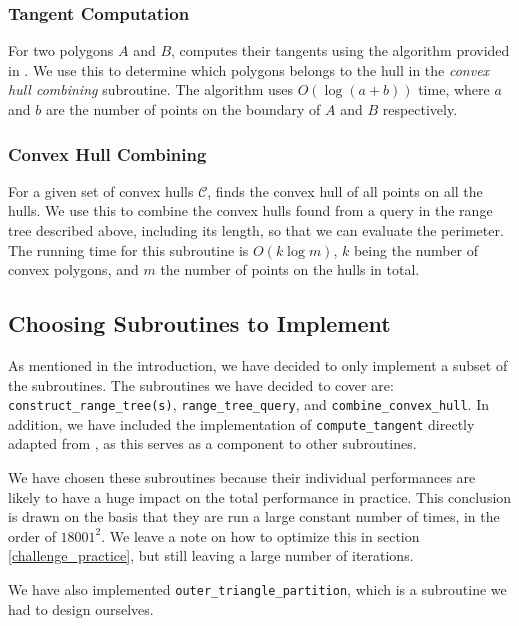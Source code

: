 \documentclass{article}
\begin{document}
\subsubsection{Tangent Computation} \label{subsub:tangent_computation}

For two polygons $A$ and $B$, computes their tangents using the algorithm provided in \cite{ks95}. We use this to determine which polygons belongs to the hull in the \textit{convex hull combining} subroutine. The algorithm uses $O(\log(a + b))$ time, where $a$ and $b$ are the number of points on the boundary of $A$ and $B$ respectively.

\subsubsection{Convex Hull Combining}
For a given set of convex hulls $\mathcal{C}$, finds the convex hull of all points on all the hulls. We use this to combine the convex hulls found from a query in the range tree described above, including its length, so that we can evaluate the perimeter. The running time for this subroutine is $O(k \log m)$, $k$ being the number of convex polygons, and $m$ the number of points on the hulls in total.

\subsection{Choosing Subroutines to Implement}

As mentioned in the introduction, we have decided to only implement a subset of the subroutines. The subroutines we have decided to cover are: \texttt{construct\_range\_tree(s)}, \texttt{range\_tree\_query}, and \texttt{combine\_convex\_hull}. In addition, we have included the implementation of \texttt{compute\_tangent} directly adapted from \cite{ks95}, as this serves as a component to other subroutines. 

We have chosen these subroutines because their individual performances are likely to have a huge impact on the total performance in practice. This conclusion is drawn on the basis that they are run a large constant number of times, in the order of $18001^2$. We leave a note on how to optimize this in section \ref{challenge_practice}, but still leaving a large number of iterations.

We have also implemented \texttt{outer\_triangle\_partition}, which is a subroutine we had to design ourselves. 
\end{document}
